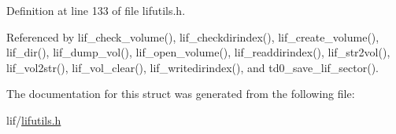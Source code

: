 Definition at line 133 of file lifutils.\+h.



Referenced by lif\+\_\+check\+\_\+volume(), lif\+\_\+checkdirindex(), lif\+\_\+create\+\_\+volume(), lif\+\_\+dir(), lif\+\_\+dump\+\_\+vol(), lif\+\_\+open\+\_\+volume(), lif\+\_\+readdirindex(), lif\+\_\+str2vol(), lif\+\_\+vol2str(), lif\+\_\+vol\+\_\+clear(), lif\+\_\+writedirindex(), and td0\+\_\+save\+\_\+lif\+\_\+sector().



The documentation for this struct was generated from the following file\+:\begin{DoxyCompactItemize}
\item 
lif/\hyperlink{lifutils_8h}{lifutils.\+h}\end{DoxyCompactItemize}
